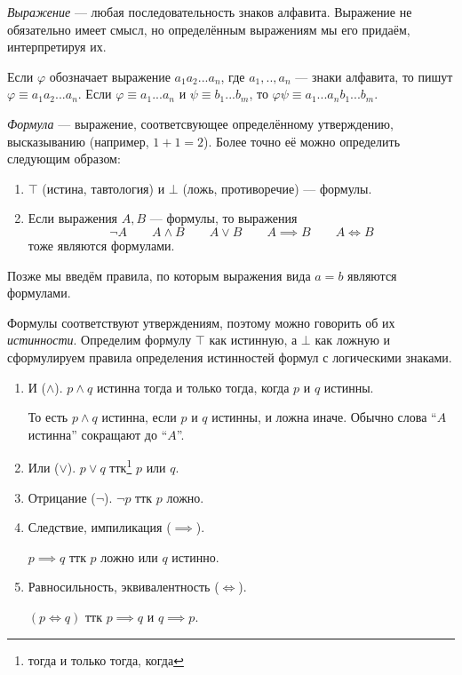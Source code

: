 {\it Выражение} --- любая последовательность знаков алфавита.
Выражение не обязательно имеет смысл, но определённым выражениям мы его придаём,
интерпретируя их.

Если $\varphi$ обозначает выражение $a_1a_2...a_{n}$,
где $a_1,..,a_{n}$ --- знаки алфавита, то пишут ${\varphi\equiv a_1a_2...a_{n}}$.
Если ${\varphi\equiv a_1...a_{n}}$ и ${\psi\equiv b_1...b_{m}}$,
то $\varphi\psi\equiv a_1...a_{n}b_1...b_{m}$.


	{\it Формула} --- выражение,
соответсвующее определённому утверждению, высказыванию
(например, $1+1=2$). Более точно её можно определить следующим образом:
\begin{enumerate}
	\item{}$\top$ (истина, тавтология) и $\bot$ (ложь, противоречие) --- формулы.
	\item{}Если выражения $A,B$ --- формулы, то выражения
	\[
		\lnot A\qquad A\land B\qquad A\lor B\qquad A\implies B\qquad A\iff B
	\]
	тоже являются формулами.
\end{enumerate}
Позже мы введём правила, по которым выражения
вида ${a=b}$ являются формулами.

Формулы соответствуют утверждениям,
поэтому можно говорить об их {\it истинности}.
Определим формулу $\top$ как истинную, а $\bot$ как ложную и
сформулируем правила определения истинностей формул с логическими знаками.
\begin{enumerate}
	\item{}И ($\land$).
	$p\land q$ истинна тогда и только тогда, когда $p$ и $q$ истинны.

	То есть $p\land q$ истинна, если $p$ и $q$ истинны,
	и ложна иначе. Обычно слова ``$A$ истинна'' сокращают до ``$A$''.

	\item{}Или ($\lor$).
	$p\lor q$ ттк\footnote{тогда и только тогда, когда} $p$ или $q$.

	\item{}Отрицание ($\lnot$).
	$\lnot p$ ттк $p$ ложно.

	\item{}Следствие,
	импиликация ($\implies$).

	$p\implies q$ ттк $p$ ложно или $q$ истинно.

	\item{}Равносильность,
	эквивалентность ($\iff$).

	$(p\iff q)$ ттк $p\implies q$ и $q\implies p$.
\end{enumerate}

